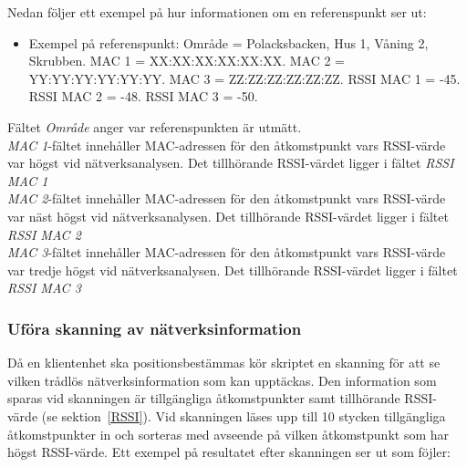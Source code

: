 \documentclass[a4paper,12pt]{article}
\begin{document}
 Nedan följer ett exempel på hur informationen om en referenspunkt ser ut:
 \begin{itemize}
   \item Exempel på referenspunkt:
         \newline Område = Polacksbacken, Hus 1, Våning 2, Skrubben.
         \newline MAC 1 = XX:XX:XX:XX:XX:XX.
         \newline MAC 2 = YY:YY:YY:YY:YY:YY.
         \newline MAC 3 = ZZ:ZZ:ZZ:ZZ:ZZ:ZZ.
         \newline RSSI MAC 1 = -45.
         \newline RSSI MAC 2 = -48.
         \newline RSSI MAC 3 = -50.
 \end{itemize}


 Fältet \textit{Område} anger var referenspunkten är utmätt. \\
 \textit{MAC 1}-fältet innehåller MAC-adressen för den åtkomstpunkt vars RSSI-värde var högst vid nätverksanalysen. Det tillhörande RSSI-värdet ligger i fältet \textit{RSSI MAC 1}\\
  \textit{MAC 2}-fältet innehåller MAC-adressen för den åtkomstpunkt vars RSSI-värde var näst högst vid nätverksanalysen. Det tillhörande RSSI-värdet ligger i fältet \textit{RSSI MAC 2}\\
   \textit{MAC 3}-fältet innehåller MAC-adressen för den åtkomstpunkt vars RSSI-värde var tredje högst vid nätverksanalysen. Det tillhörande RSSI-värdet ligger i fältet \textit{RSSI MAC 3}\\


 \subsubsection{Uföra skanning av nätverksinformation} \label{skanning}
 Då en klientenhet ska positionsbestämmas kör skriptet en skanning för att se vilken trådlös nätverksinformation som kan upptäckas. Den information som sparas vid skanningen är tillgängliga åtkomstpunkter samt tillhörande RSSI-värde (se sektion~\ref{RSSI}). Vid skanningen läses upp till 10 stycken tillgängliga åtkomstpunkter in och sorteras med avseende på vilken åtkomstpunkt som har högst RSSI-värde. Ett exempel på resultatet efter skanningen ser ut som föjler:
\end{document}
